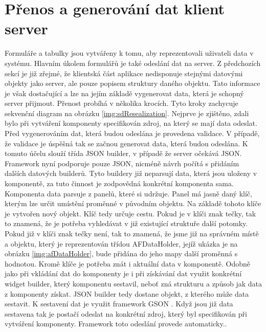 \section{Přenos a generování dat klient server}
Formuláře a tabulky jsou vytvářeny k tomu, aby reprezentovali uživateli data v systému. Hlavním úkolem formulářů je také odeslání dat na server. Z předchozích sekcí je již zřejmé, že klientská část aplikace nedisponuje stejnými datovými objekty jako server, ale pouze popisem struktury daného objektu. Tato informace je však dostačující a lze na jejím základě vygenerovat data, která je schopný server přijmout. Přenost probíhá v několika krocích. Tyto kroky zachycuje sekvenční diagram na obrázku \ref{img:sdResealization}. Nejprve je zjištěno, zdali bylo při vytváření komponenty specifikován zdroj, na který se mají data odeslat. Před vygenerováním dat, která budou odeslána je provedena validace. V případě, že validace je úspěšná tak se začnou generovat data, která budou odeslána. K tomuto účelu slouží třída JSON builder, v případě že server očekává JSON. Framework nyní podporuje pouze JSON, nicméně návrh počítá s přidáním dalších datových builderů. Tyto buildery již neparsují data, která jsou uloženy v komponentě, za tuto činnost je zodpovědná konkrétní komponenta sama. Komponenta data parsuje z panelů, které si udržuje. Panel má jasně daný klíč, kterým lze určit umístění proměnné v původním objektu. Na základě tohoto klíče je vytvořen nový objekt. Klíč tedy určuje cestu. Pokud je v klíči znak tečky, tak to znamená, že je potřeba vyhledávat v již existující struktuře další potomky. Pokud již v klíči znak tečky není, tak to znamená, že jsme již na správném místě a objektu, který je reprezentován třídou AFDataHolder, jejíž ukázka je na obrázku \ref{img:afDataHolder},  bude přidána do jeho mapy další proměnná s hodnotou. Kromě klíče je potřeba znát i aktuální data v komponentě. Odobně jako při vkládání dat do komponenty je i při získávání dat využit konkrétní widget builder, který komponentu sestavil, neboť zná strukturu a způsob jak data z komponenty získat. JSON builder tedy dostane objekt, z kterého může data sestavit. K sestavení dat je využit framework GSON \cite{gson}. Když jsou již data sestavena tak je postačí odeslat na konkrétní zdroj, který byl specifikován při vytváření komponenty. Framework toto odeslání provede automaticky..

